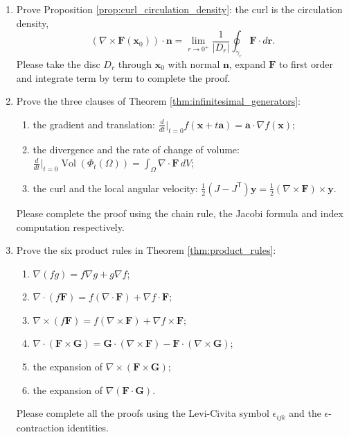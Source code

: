 \begin{enumerate}[leftmargin=3em, label=\textbf{Exercise \arabic*}]
    \item Prove Proposition \ref{prop:curl_circulation_density}:
    the curl is the circulation density,
    \[
    (\nabla\times\mathbf{F}(\mathbf{x}_0))\cdot\mathbf{n}
    =\lim_{r\to0^+}\frac{1}{|D_r|}\oint_{\gamma_r}\mathbf{F}\cdot d\mathbf{r}.
    \]
    Please take the disc $D_r$ through $\mathbf{x}_0$ with normal $\mathbf{n}$,
    expand $\mathbf{F}$ to first order and integrate term by term to complete the proof.

    \item Prove the three clauses of Theorem \ref{thm:infinitesimal_generators}:
    \begin{enumerate}[label=(\roman*)]
        \item the gradient and translation: $\frac{d}{dt}\big|_{t=0}f(\mathbf{x}+t\mathbf{a})=\mathbf{a}\cdot\nabla f(\mathbf{x})$;
        \item the divergence and the rate of change of volume: $\frac{d}{dt}\big|_{t=0}\operatorname{Vol}(\Phi_t(\Omega))=\int_\Omega\nabla\cdot\mathbf{F}\,dV$;
        \item the curl and the local angular velocity: $\frac12(J-J^{\mathsf T})\mathbf{y}=\frac12(\nabla\times\mathbf{F})\times\mathbf{y}$.
    \end{enumerate}
    Please complete the proof using the chain rule, the Jacobi formula and index computation respectively.

    \item Prove the six product rules in Theorem \ref{thm:product_rules}:
    \begin{enumerate}[label=(\roman*)]
        \item $\nabla(fg)=f\nabla g+g\nabla f$;
        \item $\nabla\cdot(f\mathbf{F})=f(\nabla\cdot\mathbf{F})+\nabla f\cdot\mathbf{F}$;
        \item $\nabla\times(f\mathbf{F})=f(\nabla\times\mathbf{F})+\nabla f\times\mathbf{F}$;
        \item $\nabla\cdot(\mathbf{F}\times\mathbf{G})=\mathbf{G}\cdot(\nabla\times\mathbf{F})-\mathbf{F}\cdot(\nabla\times\mathbf{G})$;
        \item the expansion of $\nabla\times(\mathbf{F}\times\mathbf{G})$;
        \item the expansion of $\nabla(\mathbf{F}\cdot\mathbf{G})$.
    \end{enumerate}
    Please complete all the proofs using the Levi-Civita symbol $\epsilon_{ijk}$ and the $\epsilon$-contraction identities.


\end{enumerate}
